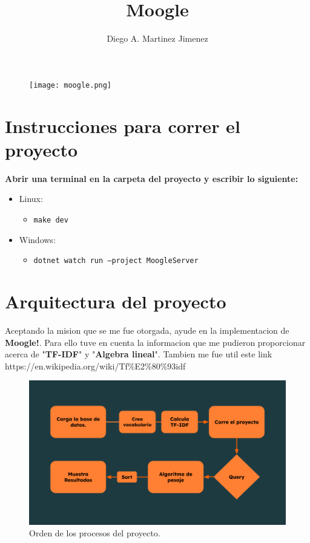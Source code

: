 \documentclass[10pt,a4paper]{report}
\author{Diego A. Martinez Jimenez}
\title{Moogle}
\begin{document}
	
	
\maketitle
	
\begin{figure}
\begin{center}
\texttt{[image: moogle.png]} 
\end{center}
\end{figure}

\section*{Instrucciones para correr el proyecto}
	
\textbf{Abrir una terminal en la carpeta del proyecto y escribir lo siguiente:}
	
\begin{itemize}
\item Linux: 
	\begin{itemize} \item \texttt{make dev} \end{itemize}
\item Windows:
	\begin{itemize} \item \texttt{dotnet watch run --project MoogleServer}\end{itemize}
\end{itemize}
	
\section*{Arquitectura del proyecto}
		
Aceptando la mision que se me fue otorgada, ayude en la implementacion de \textbf{Moogle!}. Para ello tuve en cuenta la informacion que me pudieron proporcionar acerca de "\textbf{TF-IDF}" y "\textbf{Algebra lineal}". Tambien me fue util este link  https://en.wikipedia.org/wiki/Tf\%E2\%80\%93idf

\begin{figure}[h]
\includegraphics[width = 1\linewidth]{Project.png}
\caption{Orden de los procesos del proyecto.}
\end{figure}
\end{document}
